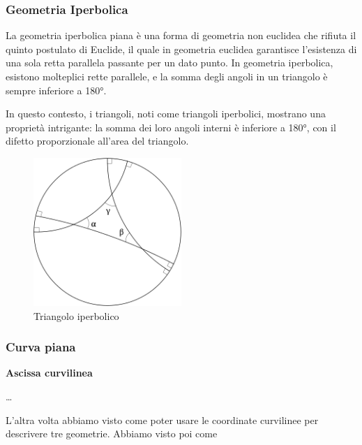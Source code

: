 \subsubsection{Geometria Iperbolica}

La geometria iperbolica piana è una forma di geometria non euclidea che rifiuta il quinto postulato di Euclide, il quale in geometria euclidea garantisce l'esistenza di una sola retta parallela passante per un dato punto. In geometria iperbolica, esistono molteplici rette parallele, e la somma degli angoli in un triangolo è sempre inferiore a 180°.


In questo contesto, i triangoli, noti come triangoli iperbolici, mostrano una proprietà intrigante: la somma dei loro angoli interni è inferiore a 180°, con il difetto proporzionale all'area del triangolo.

\begin{figure}[H]
    \centering
    \includegraphics[width=0.5\textwidth]{assets/hyperbolic_triangle.png}
    \caption{Triangolo iperbolico}
\end{figure}

\subsubsection{Curva piana}

\textbf{Ascissa curvilinea}

\dots

\newpage

L'altra volta abbiamo visto come poter usare le coordinate curvilinee per descrivere tre geometrie.
Abbiamo visto poi come 

